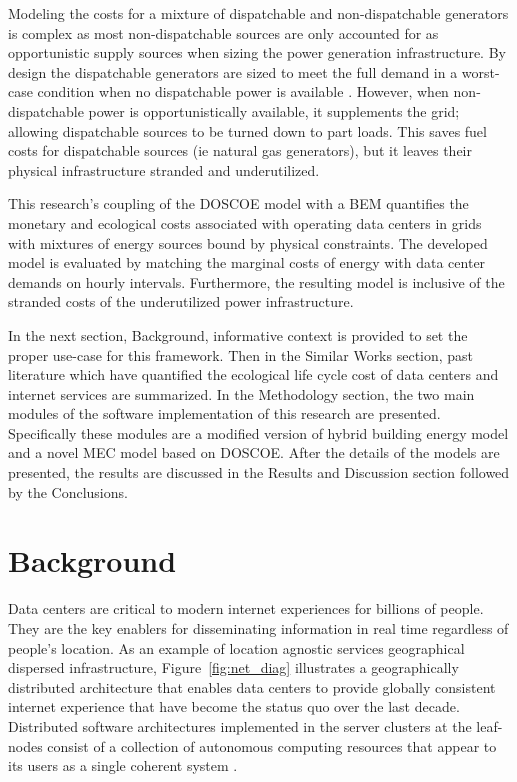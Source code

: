 Modeling the costs for a mixture of dispatchable and non-dispatchable generators is complex as most non-dispatchable sources are only accounted for as opportunistic supply sources when sizing the power generation infrastructure. By design the dispatchable generators are sized to meet the full demand in a worst-case condition when no dispatchable power is available \citep{platt17}. However, when non-dispatchable power is opportunistically available, it supplements the grid; allowing dispatchable sources to be turned down to part loads. This saves fuel costs for dispatchable sources (ie natural gas generators), but it leaves their physical infrastructure stranded and underutilized. 

This research’s coupling of the DOSCOE model with a BEM quantifies the monetary and ecological costs associated with operating data centers in grids with mixtures of energy sources bound by physical constraints. The developed model is evaluated by matching the marginal costs of energy with data center demands on hourly intervals. Furthermore, the resulting model is inclusive of the stranded costs of the underutilized power infrastructure.

In the next section, Background, informative context is provided to set the proper use-case for this framework. Then in the Similar Works section, past literature which have quantified the ecological life cycle cost of data centers and internet services are summarized. In the Methodology section, the two main modules of the software implementation of this research are presented. Specifically these modules are a modified version of hybrid building energy model and a novel MEC model based on DOSCOE. After the details of the models are presented, the results are discussed in the Results and Discussion section followed by the Conclusions.


\section{Background}
\label{sec: mec_background}
Data centers are critical to modern internet experiences for billions of people. They are the key enablers for disseminating information in real time regardless of people's location. As an example of location agnostic services geographical dispersed infrastructure, Figure~\ref{fig:net_diag} illustrates a geographically distributed architecture that enables data centers to provide globally consistent internet experience that have become the status quo over the last decade. Distributed software architectures implemented in the server clusters at the leaf-nodes consist of a collection of autonomous computing resources that appear to its users as a single coherent system \citep{tanenbaum}.

